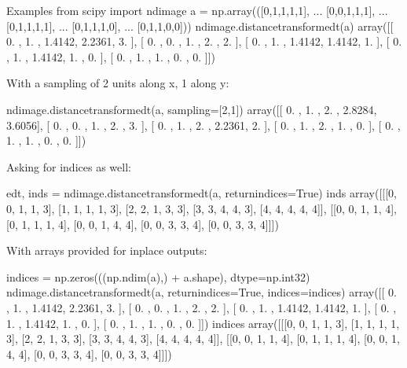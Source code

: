 \documentclass[letterpaper,10pt,english]{sphinxmanual}
\begin{document}
\begin{sphinxVerbatim}[commandchars=\\\{\}]
    Examples
    \PYGZhy{}\PYGZhy{}\PYGZhy{}\PYGZhy{}\PYGZhy{}\PYGZhy{}\PYGZhy{}\PYGZhy{}
    \PYGZgt{}\PYGZgt{}\PYGZgt{} from scipy import ndimage
    \PYGZgt{}\PYGZgt{}\PYGZgt{} a = np.array(([0,1,1,1,1],
    ...               [0,0,1,1,1],
    ...               [0,1,1,1,1],
    ...               [0,1,1,1,0],
    ...               [0,1,1,0,0]))
    \PYGZgt{}\PYGZgt{}\PYGZgt{} ndimage.distance\PYGZus{}transform\PYGZus{}edt(a)
    array([[ 0.    ,  1.    ,  1.4142,  2.2361,  3.    ],
           [ 0.    ,  0.    ,  1.    ,  2.    ,  2.    ],
           [ 0.    ,  1.    ,  1.4142,  1.4142,  1.    ],
           [ 0.    ,  1.    ,  1.4142,  1.    ,  0.    ],
           [ 0.    ,  1.    ,  1.    ,  0.    ,  0.    ]])
    
    With a sampling of 2 units along x, 1 along y:
    
    \PYGZgt{}\PYGZgt{}\PYGZgt{} ndimage.distance\PYGZus{}transform\PYGZus{}edt(a, sampling=[2,1])
    array([[ 0.    ,  1.    ,  2.    ,  2.8284,  3.6056],
           [ 0.    ,  0.    ,  1.    ,  2.    ,  3.    ],
           [ 0.    ,  1.    ,  2.    ,  2.2361,  2.    ],
           [ 0.    ,  1.    ,  2.    ,  1.    ,  0.    ],
           [ 0.    ,  1.    ,  1.    ,  0.    ,  0.    ]])
    
    Asking for indices as well:
    
    \PYGZgt{}\PYGZgt{}\PYGZgt{} edt, inds = ndimage.distance\PYGZus{}transform\PYGZus{}edt(a, return\PYGZus{}indices=True)
    \PYGZgt{}\PYGZgt{}\PYGZgt{} inds
    array([[[0, 0, 1, 1, 3],
            [1, 1, 1, 1, 3],
            [2, 2, 1, 3, 3],
            [3, 3, 4, 4, 3],
            [4, 4, 4, 4, 4]],
           [[0, 0, 1, 1, 4],
            [0, 1, 1, 1, 4],
            [0, 0, 1, 4, 4],
            [0, 0, 3, 3, 4],
            [0, 0, 3, 3, 4]]])
    
    With arrays provided for inplace outputs:
    
    \PYGZgt{}\PYGZgt{}\PYGZgt{} indices = np.zeros(((np.ndim(a),) + a.shape), dtype=np.int32)
    \PYGZgt{}\PYGZgt{}\PYGZgt{} ndimage.distance\PYGZus{}transform\PYGZus{}edt(a, return\PYGZus{}indices=True, indices=indices)
    array([[ 0.    ,  1.    ,  1.4142,  2.2361,  3.    ],
           [ 0.    ,  0.    ,  1.    ,  2.    ,  2.    ],
           [ 0.    ,  1.    ,  1.4142,  1.4142,  1.    ],
           [ 0.    ,  1.    ,  1.4142,  1.    ,  0.    ],
           [ 0.    ,  1.    ,  1.    ,  0.    ,  0.    ]])
    \PYGZgt{}\PYGZgt{}\PYGZgt{} indices
    array([[[0, 0, 1, 1, 3],
            [1, 1, 1, 1, 3],
            [2, 2, 1, 3, 3],
            [3, 3, 4, 4, 3],
            [4, 4, 4, 4, 4]],
           [[0, 0, 1, 1, 4],
            [0, 1, 1, 1, 4],
            [0, 0, 1, 4, 4],
            [0, 0, 3, 3, 4],
            [0, 0, 3, 3, 4]]])
\end{sphinxVerbatim}
\end{document}
